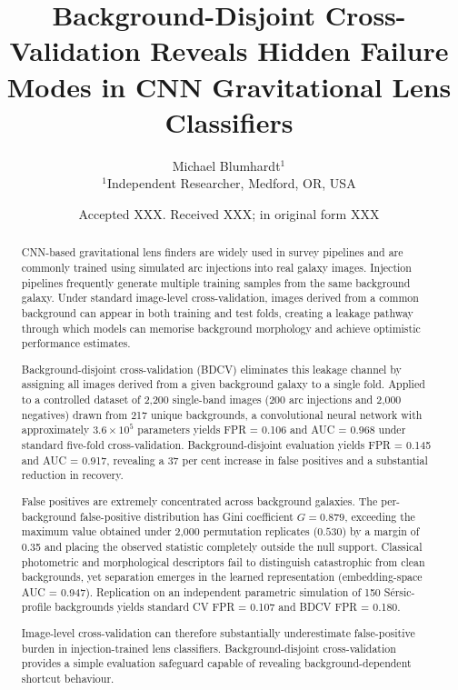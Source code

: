 \documentclass[fleqn,usenatbib]{mnras}
\title[Background-Disjoint CV for Lens Classifiers]{Background-Disjoint Cross-Validation Reveals Hidden Failure Modes
in CNN Gravitational Lens Classifiers}
\author[M.\ Blumhardt]{Michael Blumhardt$^{1}$\\
$^{1}$Independent Researcher, Medford, OR, USA}
\date{Accepted XXX. Received XXX; in original form XXX}
\begin{document}
\label{firstpage}
\pagerange{\pageref{firstpage}--\pageref{lastpage}}
\maketitle

\begin{abstract}
CNN-based gravitational lens finders are widely used in survey pipelines
and are commonly trained using simulated arc injections into real galaxy
images. Injection pipelines frequently generate multiple training samples
from the same background galaxy. Under standard image-level
cross-validation, images derived from a common background can appear in
both training and test folds, creating a leakage pathway through which
models can memorise background morphology and achieve optimistic
performance estimates.

Background-disjoint cross-validation (BDCV) eliminates this leakage
channel by assigning all images derived from a given background galaxy to
a single fold. Applied to a controlled dataset of 2,200 single-band
images (200 arc injections and 2,000 negatives) drawn from 217 unique
backgrounds, a convolutional neural network with approximately
$3.6\times10^5$ parameters yields FPR = 0.106 and AUC = 0.968 under
standard five-fold cross-validation. Background-disjoint evaluation
yields FPR = 0.145 and AUC = 0.917, revealing a 37 per cent increase in
false positives and a substantial reduction in recovery.

False positives are extremely concentrated across background galaxies.
The per-background false-positive distribution has Gini coefficient
$G = 0.879$, exceeding the maximum value obtained under 2,000
permutation replicates ($0.530$) by a margin of 0.35 and placing the
observed statistic completely outside the null support. Classical
photometric and morphological descriptors fail to distinguish catastrophic
from clean backgrounds, yet separation emerges in the learned
representation (embedding-space AUC = 0.947). Replication on an
independent parametric simulation of 150 S\'{e}rsic-profile backgrounds
yields standard CV FPR = 0.107 and BDCV FPR = 0.180.

Image-level cross-validation can therefore substantially underestimate
false-positive burden in injection-trained lens classifiers.
Background-disjoint cross-validation provides a simple evaluation
safeguard capable of revealing background-dependent shortcut behaviour.
\end{abstract}
\end{document}
